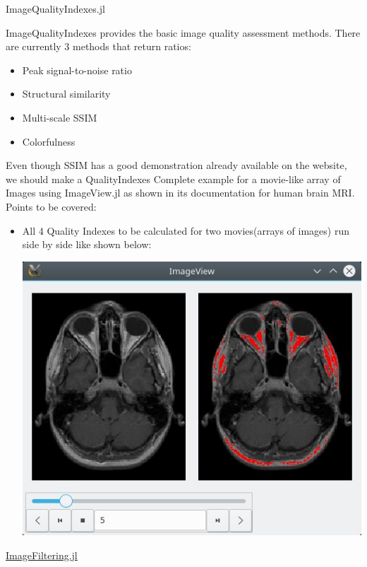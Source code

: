 


\vspace{0.5cm}
\Large
\textsf{ImageQualityIndexes.jl}

\vspace{0.5cm}
\large
ImageQualityIndexes provides the basic image quality assessment methods.
There are currently 3 methods that return ratios:
\begin{itemize}
    \item Peak signal-to-noise ratio
    \item Structural similarity
    \item Multi-scale SSIM
    \item Colorfulness
\end{itemize}
Even though SSIM has a good demonstration already available on the website, we should make a QualityIndexes Complete example for a movie-like array of Images using ImageView.jl as shown in its documentation for human brain MRI.
Points to be covered:
\begin{itemize}
    \item All 4 Quality Indexes to be calculated for two movies(arrays of images) run side by side like shown below:
    \begin{displayquote}
       \includegraphics[scale=0.8]{assets/coupled.jpg}
    \end{displayquote}
\end{itemize}

\vspace{0.5cm}
\Large
\underline{ImageFiltering.jl}

